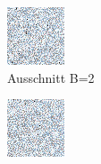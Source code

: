 \begin{figure}[H]

    \begin{subfigure}[b]{0.2\linewidth}
        \includegraphics[width=\linewidth]{content/TemporalerAlg/Bilder/Sorting/DiffDimensions/2/seed_debug_5.0_small_screen.png}
         \caption{Ausschnitt B=2}
         \label{pic:screen_B2}
    \end{subfigure}
    \begin{subfigure}[b]{0.2\linewidth}
        \includegraphics[width=\linewidth]{content/TemporalerAlg/Bilder/Sorting/DiffDimensions/3/seed_debug_5.0_small_screen.png}

\end{subfigure}
\end{figure}
